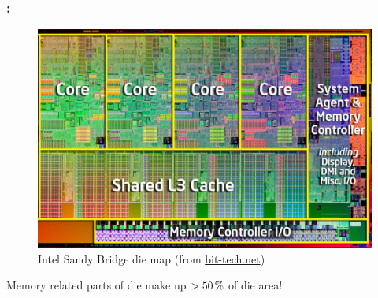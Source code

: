 \documentclass[9pt,xcolor=table]{beamer}
\begin{document}
\begin{frame}
\frametitle{\insertsectionhead{}: \insertsubsection{}}
\begin{figure}[htb]
      \includegraphics[height=0.65\textheight]{img/sandy-bridge-die-map_noIGP}\\[2pt]\small
      Intel\textregistered{} Sandy Bridge \textregistered{} die map (from \href{http://www.bit-tech.net/hardware/cpus/2011/01/03/intel-sandy-bridge-review/1}{bit-tech.net})
    \end{figure}
    \begin{center}\large
      \alert{Memory related parts of die make up $>\unit[50]{\%}$ of
        die area!}
    \end{center}
\end{frame}
\end{document}
